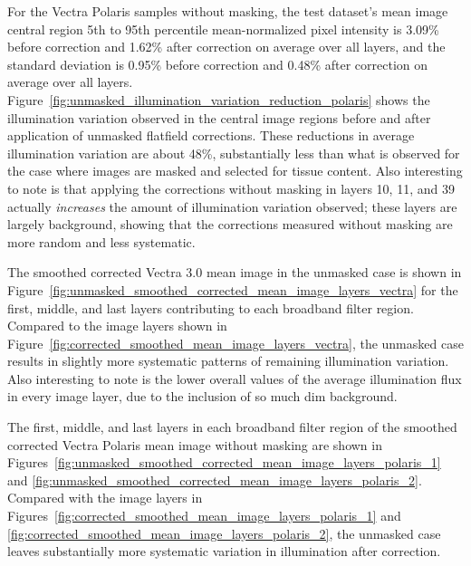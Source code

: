 \documentclass[letterpaper,11pt]{article}
\newcommand{\reffig}[1]{Figure~\ref{#1}}
\begin{document}
For the Vectra Polaris samples without masking, the test dataset's mean image central region 5th to 95th percentile mean-normalized pixel intensity is 3.09\% before correction and 1.62\% after correction on average over all layers, and the standard deviation is 0.95\% before correction and 0.48\% after correction on average over all layers. \reffig{fig:unmasked_illumination_variation_reduction_polaris} shows the illumination variation observed in the central image regions before and after application of unmasked flatfield corrections. These reductions in average illumination variation are about 48\%, substantially less than what is observed for the case where images are masked and selected for tissue content. Also interesting to note is that applying the corrections without masking in layers 10, 11, and 39 actually \textit{increases} the amount of illumination variation observed; these layers are largely background, showing that the corrections measured without masking are more random and less systematic.

The smoothed corrected Vectra 3.0 mean image in the unmasked case is shown in \reffig{fig:unmasked_smoothed_corrected_mean_image_layers_vectra} for the first, middle, and last layers contributing to each broadband filter region. Compared to the image layers shown in \reffig{fig:corrected_smoothed_mean_image_layers_vectra}, the unmasked case results in slightly more systematic patterns of remaining illumination variation. Also interesting to note is the lower overall values of the average illumination flux in every image layer, due to the inclusion of so much dim background.

The first, middle, and last layers in each broadband filter region of the smoothed corrected Vectra Polaris mean image without masking are shown in Figures~\ref{fig:unmasked_smoothed_corrected_mean_image_layers_polaris_1} and \ref{fig:unmasked_smoothed_corrected_mean_image_layers_polaris_2}. Compared with the image layers in Figures~\ref{fig:corrected_smoothed_mean_image_layers_polaris_1} and \ref{fig:corrected_smoothed_mean_image_layers_polaris_2}, the unmasked case leaves substantially more systematic variation in illumination after correction.

\clearpage
\end{document}
